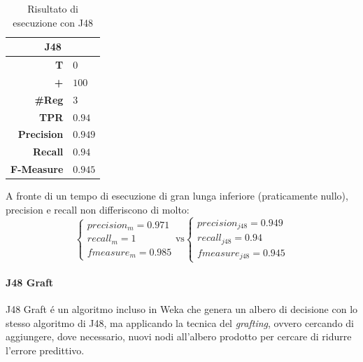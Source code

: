 \documentclass[preprint]{acm_proc_article-sp}
\begin{document}
\begin{table}[h]
\centering
\begin{tabular}{|r|l|} \hline
\multicolumn{2}{|c|}{\textbf{J48}} \\ \hline \hline 
\textbf{T} & $0$ \\ \hline
\textbf{+} & $100$ \\ \hline
\textbf{\#Reg} & $3$\\ \hline
\textbf{TPR} & $0.94$ \\ \hline
\textbf{Precision} & $0.949$ \\ \hline
\textbf{Recall} & $0.94$ \\  \hline
\textbf{F-Measure} & $0.945$ \\
\hline\end{tabular}
\caption{Risultato di esecuzione con J48}
\label{table:risultati-j48}
\end{table}

A fronte di un tempo di esecuzione di gran lunga inferiore (praticamente nullo), precision e recall non differiscono di molto:
\[
\begin{cases}
precision_m = 0.971 \\
recall_m = 1 \\
fmeasure_m = 0.985
\end{cases}
\mbox{vs}
\begin{cases}
precision_{j48} = 0.949 \\
recall_{j48} = 0.94 \\
fmeasure_{j48} = 0.945
\end{cases}
\]

\paragraph{J48 Graft} J48 Graft \'e un algoritmo incluso in Weka che genera un albero di decisione con lo stesso algoritmo di J48, ma applicando la tecnica del \textit{grafting}\cite{Webb1999}, ovvero cercando di aggiungere, dove necessario, nuovi nodi all'albero prodotto per cercare di ridurre l'errore predittivo.
\end{document}
